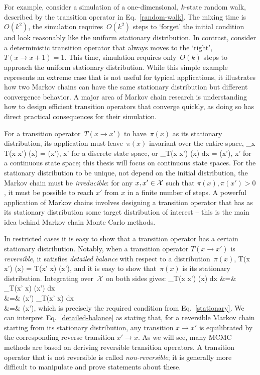 \documentclass[angelino.tex]{subfiles}
\begin{document}
For example, consider a simulation of a one-dimensional, $k$-state random walk,
described by the transition operator in Eq.~\ref{random-walk}.
The mixing time is~$O(k^2)$, \ie the simulation requires~$O(k^2)$ steps to
`forget' the initial condition and look reasonably like
the uniform stationary distribution.
In contrast, consider a deterministic transition operator that always moves
to the `right', \ie $T(x \rightarrow x + 1) = 1$.
This time, simulation requires only~$O(k)$ steps to approach
the uniform stationary distribution.
While this simple example represents an extreme case that is not useful for
typical applications, it illustrates how two Markov chains can have the
same stationary distribution but different convergence behavior.
A major area of Markov chain research is understanding how to design efficient
transition operators that converge quickly, as doing so has direct practical
consequences for their simulation.

For a transition operator~$T(x \rightarrow x')$ to have~$\pi(x)$ as its
stationary distribution, its application must leave~$\pi(x)$ invariant
over the entire space, \ie
\be
\sum_{x \in \X} T(x \rightarrow x') \pi(x) = \pi(x'), \quad \forall x' \in \X \nn
\ee
for a discrete state space, or
\be
\int_\X T(x \rightarrow x') \pi(x) dx = \pi(x'), \quad \forall x' \in \X \label{stationary}
\ee
for a continuous state space; this thesis will focus on continuous state spaces.
For the stationary distribution to be unique, \ie not depend on
the initial distribution, the Markov chain must be \emph{irreducible}:
for any $x, x' \in {\mathcal X}$ such that $\pi(x), \pi(x') > 0$,
it must be possible to reach $x'$ from $x$ in a finite number of steps.
A powerful application of Markov chains involves designing a transition operator
that has as its stationary distribution some target distribution of interest
-- this is the main idea behind Markov chain Monte Carlo methods.

In restricted cases it is easy to show that a transition operator has a certain
stationary distribution.
Notably, when a transition operator $T(x \rightarrow x')$ is \emph{reversible},
it satisfies \emph{detailed balance} with respect to a distribution~$\pi(x)$,
\be
T(x \rightarrow x') \pi(x) = T(x' \rightarrow x) \pi(x'), \label{detailed-balance}
\ee
and it is easy to show that~$\pi(x)$ is its stationary distribution.
Integrating over~${\mathcal X}$ on both sides gives:
\bea
\int_\X T(x \rightarrow x') \pi(x) dx
&=& \int_\X T(x' \rightarrow x) \pi(x') dx \nn \\
&=& \pi(x') \int_\X T(x' \rightarrow x) dx \nn \\
&=& \pi(x'), \nn
\eea
which is precisely the required condition from Eq.~\ref{stationary}.
We can interpret Eq.~\ref{detailed-balance} as stating that,
for a reversible Markov chain starting from its stationary distribution,
any transition $x \rightarrow x'$ is equilibrated by
the corresponding reverse transition $x' \rightarrow x$.
As we will see, many MCMC methods are based on deriving reversible
transition operators.
A transition operator that is not reversible is called \emph{non-reversible};
it is generally more difficult to manipulate and prove statements about these.
\end{document}
